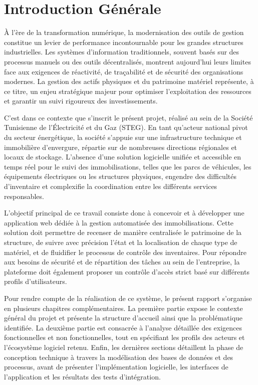 \chapter*{Introduction Générale}

À l'ère de la transformation numérique, la modernisation des outils de gestion constitue un levier de performance incontournable pour les grandes structures industrielles. Les systèmes d'information traditionnels, souvent basés sur des processus manuels ou des outils décentralisés, montrent aujourd'hui leurs limites face aux exigences de réactivité, de traçabilité et de sécurité des organisations modernes. La gestion des actifs physiques et du patrimoine matériel représente, à ce titre, un enjeu stratégique majeur pour optimiser l'exploitation des ressources et garantir un suivi rigoureux des investissements.

C'est dans ce contexte que s'inscrit le présent projet, réalisé au sein de la Société Tunisienne de l'Électricité et du Gaz (STEG). En tant qu'acteur national pivot du secteur énergétique, la société s'appuie sur une infrastructure technique et immobilière d'envergure, répartie sur de nombreuses directions régionales et locaux de stockage. L'absence d'une solution logicielle unifiée et accessible en temps réel pour le suivi des immobilisations, telles que les parcs de véhicules, les équipements électriques ou les structures physiques, engendre des difficultés d'inventaire et complexifie la coordination entre les différents services responsables.

L'objectif principal de ce travail consiste donc à concevoir et à développer une application web dédiée à la gestion automatisée des immobilisations. Cette solution doit permettre de recenser de manière centralisée le patrimoine de la structure, de suivre avec précision l'état et la localisation de chaque type de matériel, et de fluidifier le processus de contrôle des inventaires. Pour répondre aux besoins de sécurité et de répartition des tâches au sein de l'entreprise, la plateforme doit également proposer un contrôle d'accès strict basé sur différents profils d'utilisateurs.

Pour rendre compte de la réalisation de ce système, le présent rapport s'organise en plusieurs chapitres complémentaires. La première partie expose le contexte général du projet et présente la structure d'accueil ainsi que la problématique identifiée. La deuxième partie est consacrée à l'analyse détaillée des exigences fonctionnelles et non fonctionnelles, tout en spécifiant les profils des acteurs et l'écosystème logiciel retenu. Enfin, les dernières sections détaillent la phase de conception technique à travers la modélisation des bases de données et des processus, avant de présenter l'implémentation logicielle, les interfaces de l'application et les résultats des tests d'intégration.
